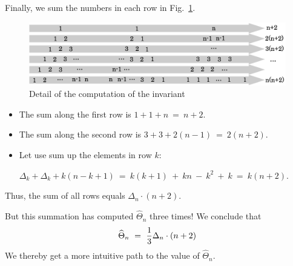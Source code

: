 Finally, we sum the numbers in each row in Fig.~\ref{fig:Tetrahedral4}.
\begin{figure}[h]
\begin{center}
        \includegraphics[scale=0.32]{FiguresArithmetic/appTetrahedral4}
        \caption{Detail of the computation of the invariant}
        \label{fig:Tetrahedral4}
\end{center}
\end{figure}
\begin{itemize}
\item 
The sum along the first row is  $1+1+n \ = \ n+2$.
\item
The sum along the second row is $3 + 3 + 2 (n-1) \ = \ 2(n+2)$. 
\item
Let use sum up the elements in row $k$: 

$\Delta_k + \Delta_k + k(n-k+1) \ = \ k(k+1) \ + \ kn \ - \ k^2 \ + \ k \ = \  k(n+2)$.
\end{itemize}
Thus, the sum of all rows equals $\Delta_n \cdot (n+2)$.

\smallskip

But this summation has computed $\widehat{\Theta}_n$ three times!  We conclude that
\[ \widehat{\Theta}_n \ = \ {1 \over 3} \Delta_n \cdot (n+2) \]
We thereby get a more intuitive path to the value of $\widehat{\Theta}_n$.

\medskip


